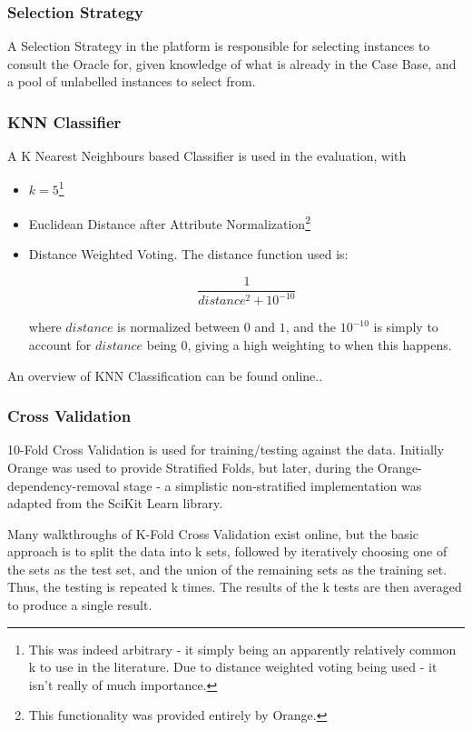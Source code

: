 \documentclass[a4paper,11pt]{report}
\begin{document}
\subsubsection{Selection Strategy}

A Selection Strategy in the platform is responsible for selecting instances to consult the Oracle for, given knowledge of what is already in the Case Base, and a pool of unlabelled instances to select from.

\subsubsection{KNN Classifier}
A K Nearest Neighbours based Classifier is used in the evaluation, with 
\begin{itemize}
	\item $k=5$\footnote{This was indeed arbitrary - it simply being an apparently relatively common k to use in the literature. Due to distance weighted voting being used - it isn't really of much importance.} 
	\item Euclidean Distance after Attribute Normalization\footnote {This functionality was provided entirely by Orange.}
	\item Distance Weighted Voting. The distance function used is:
	
	\[
	\frac{1}{distance^{2}+10^{-10}}
	\]
	
	where $distance$ is normalized between $0$ and $1$, and the $10^{-10}$ is simply to account for $distance$ being $0$, giving a high weighting to when this happens.
	
	
\end{itemize}

An overview of KNN Classification can be found online.\cite{web:knntut}.

\subsubsection{Cross Validation}

10-Fold Cross Validation is used for training/testing against the data. Initially Orange was used to provide Stratified Folds, but later, during the Orange-dependency-removal stage - a simplistic non-stratified implementation was adapted from the SciKit Learn library\cite{prog:sklearn}.

Many walkthroughs of K-Fold Cross Validation exist online\cite{web:kfolddemo}, but the basic approach is to split the data into k sets, followed by iteratively choosing one of the sets as the test set, and the union of the remaining sets as the training set. Thus, the testing is repeated k times. The results of the k tests are then averaged to produce a single result.
\end{document}
